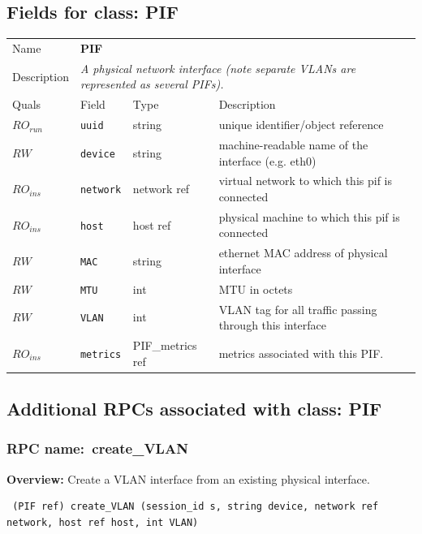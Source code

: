 \subsection{Fields for class: PIF}
\begin{longtable}{|lllp{}|}
\hline
\multicolumn{1}{|l}{Name} & \multicolumn{3}{l|}{\bf PIF} \\
\multicolumn{1}{|l}{Description} & \multicolumn{3}{l|}{\parbox{11cm}{\em A
physical network interface (note separate VLANs are represented as several
PIFs).}} \\
\hline
Quals & Field & Type & Description \\
\hline
$\mathit{RO}_\mathit{run}$ &  {\tt uuid} & string & unique identifier/object reference \\
$\mathit{RW}$ &  {\tt device} & string & machine-readable name of the interface (e.g. eth0) \\
$\mathit{RO}_\mathit{ins}$ &  {\tt network} & network ref & virtual network to which this pif is connected \\
$\mathit{RO}_\mathit{ins}$ &  {\tt host} & host ref & physical machine to which this pif is connected \\
$\mathit{RW}$ &  {\tt MAC} & string & ethernet MAC address of physical interface \\
$\mathit{RW}$ &  {\tt MTU} & int & MTU in octets \\
$\mathit{RW}$ &  {\tt VLAN} & int & VLAN tag for all traffic passing through this interface \\
$\mathit{RO}_\mathit{ins}$ &  {\tt metrics} & PIF\_metrics ref & metrics associated with this PIF. \\
\hline
\end{longtable}
\subsection{Additional RPCs associated with class: PIF}
\subsubsection{RPC name:~create\_VLAN}

{\bf Overview:} 
Create a VLAN interface from an existing physical interface.

\begin{verbatim} (PIF ref) create_VLAN (session_id s, string device, network ref network, host ref host, int VLAN)\end{verbatim}


